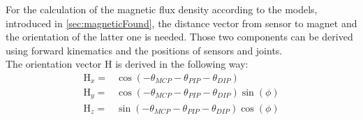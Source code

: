 For the calculation of the magnetic flux density according to the models, introduced in \ref{sec:magneticFound}, the distance vector from sensor to magnet and the orientation of the latter one is needed. Those two components can be derived using forward kinematics and the positions of sensors and joints.\\
The orientation vector $ \mathrm{H} $ is derived in the following way:
\begin{equation}\label{eq:orienH}
\begin{aligned}
\mathrm{H}_{x} =& \cos(-\theta_{MCP}-\theta_{PIP}-\theta_{DIP})\\[3pt]
\mathrm{H}_{y} =& \cos(-\theta_{MCP}-\theta_{PIP}-\theta_{DIP})\sin(\phi)\\[3pt]
\mathrm{H}_{z} =& \sin(-\theta_{MCP}-\theta_{PIP}-\theta_{DIP})\cos(\phi)
\end{aligned}
\end{equation}

